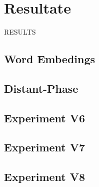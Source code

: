 \chapter{Resultate}
RESULTS
\section{Word Embedings}
\blindtext
\section{Distant-Phase}
\blindtext
\section{Experiment V6}
\blindtext
\section{Experiment V7}
\blindtext
\section{Experiment V8}
\blindtext